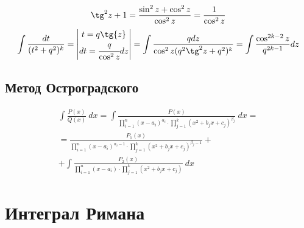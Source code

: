 \begin{comm}
    \[\tg^2z+1=\frac{\sin^2z+\cos^2z}{\cos^2z}=\frac{1}{\cos^2z}\]
    \[\int \frac{dt}{(t^2+q^2)^k}=\begin{vmatrix} t=q\tg{z}\\ dt=\cfrac{q}{\cos^2z}dz\end{vmatrix}=\int \frac{qdz}{\cos^2z(q^2\tg^2z+q^2)^k}=\int \frac{\cos^{2k-2}z}{q^{2k-1}}dz\]
\end{comm}
\subsection{Метод Остроградского}
\begin{multline*}
    \int \frac{P(x)}{Q(x)}\ dx=\int \frac{P(x)}{\prod\limits_{i=1}^{n}(x-a_i)^{\alpha_i}\cdot \prod\limits_{j=1}^{k}(x^2+b_j x+c_j)^{\beta_j}}\ dx=\\
    =\frac{P_1(x)}{\prod\limits_{i=1}^{n}(x-a_i)^{\alpha_i-1}\cdot \prod\limits_{j=1}^{k}(x^2+b_j x+c_j)^{\beta_j-1}}+\\
    +\int \frac{P_2(x)}{\prod\limits_{i=1}^{n}(x-a_i)\cdot \prod\limits_{j=1}^{k}(x^2+b_j x+c_j)}\ dx
\end{multline*}
\newpage
\section{Интеграл Римана}
